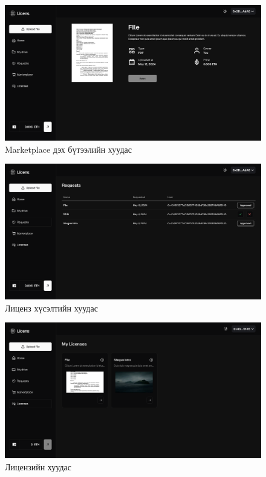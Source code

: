 \begin{figure}[h!]
	\centering
	\includegraphics[scale=0.16]{src/images/marketplace-file.png}
	\caption{Marketplace дэх бүтээлийн хуудас}
\end{figure}

\begin{figure}[h!]
	\centering
	\includegraphics[scale=0.16]{src/images/requests.png}
	\caption{Лиценз хүсэлтийн  хуудас}
\end{figure}

\begin{figure}[h!]
	\centering
	\includegraphics[scale=0.16]{src/images/licences.png}
	\caption{Лицензийн хуудас}
\end{figure}

